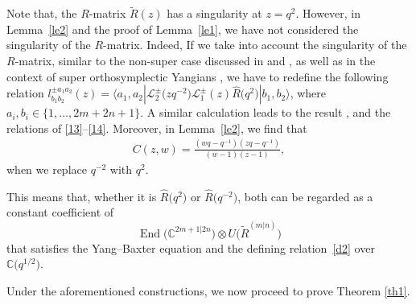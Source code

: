 \documentclass[pdftex]{sigma}
\numberwithin{equation}{section}
\begin{document}
\begin{Remark}Note that, the $R$-matrix $\widetilde{R}(z)$ has a singularity at $z=q^{2}$. However, in Lemma~\ref{le2} and the proof of Lemma~\ref{le1}, we have not considered the singularity of the $R$-matrix. Indeed, If we take into account the singularity of the $R$-matrix, similar to the non-super case discussed in \cite{JMA} and \cite{JMAB}, as well as in the context of super orthosymplectic Yangians \cite{AIM}, we have to redefine the following relation
$l^{\pm a_1a_2}_{b_1b_2}(z)=\langle a_1, a_2|\mathcal{L}_2^{\pm}\bigl(zq^{-2}\bigr)\mathcal{L}_1^{\pm}(z)\widehat{R}\bigl(q^{2}\bigr)|b_1, b_2\rangle$,
where $a_i, b_i\in\{1,\dots,2m+2n+1\}$. A similar calculation leads to the result
,
and the relations of \eqref{13}--\eqref{14}. Moreover, in Lemma~\ref{le2}, we find that
\begin{gather*}
 C(z,w)
=\frac{(wq-q^{-1})(zq-q^{-1})}{(w-1)(z-1)},
\end{gather*}when we replace $q^{-2}$ with $q^2$.

This means that, whether it is $\widehat{R}\bigl(q^{2}\bigr)$ or $\widehat{R}\bigl(q^{-2}\bigr)$, both can be regarded as a constant coefficient of \[\operatorname{End}\bigl(\mathbb{C}^{2m+1|2n}\bigr)\otimes U\bigl(\widetilde{R}^{(m|n)}\bigr)\] that satisfies the Yang--Baxter equation and the defining relation~\eqref{d2} over~$\mathbb{C}\bigl(q^{1/2}\bigr)$.
\end{Remark}



Under the aforementioned constructions, we now proceed to prove Theorem \ref{th1}.
\end{document}
